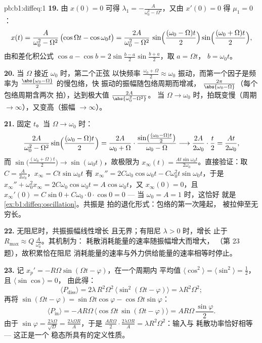 \begin{solution}{pb:b1:diffeq:1}
\textbf{19.} 由 $x(0) = 0$ 可得 $\lambda_1 = -\frac A{\omega_0^2 -
\Omega^2}$，又由 $x'(0) = 0$ 得 $\mu_1 = 0$：
\[
x(t) = \frac{A}{\omega_0^2 - \Omega^2}\,
\bigl(\cos\Omega t - \cos\omega_0 t\bigr)
= \frac{2A}{\omega_0^2 - \Omega^2}\,
\sin\Bigl(\frac{(\omega_0 - \Omega)t}2\Bigr)
\sin\Bigl(\frac{(\omega_0 + \Omega)t}2\Bigr) ,
\]
由和差化积公式 $\cos a - \cos b =
2\sin\frac{b - a}2\sin\frac{b + a}2$，取 $a = \Omega t$，
$b = \omega_0 t$。

\textbf{20.} 当 $\Omega$ 接近 $\omega_0$ 时，第二个正弦
以快频率 $\frac{\omega_0 + \Omega}2
\approx \omega_0$ 振动，而第一个因子是频率为
$\frac{\abs{\omega_0 - \Omega}}2$ 的慢包络，快
振动的振幅随包络周期而增减，
$\frac{2\pi}{\abs{\omega_0 - \Omega}}$（每个包络周期含两次
拍），达到极大值 $\frac{2A}{\abs{\omega_0^2 - \Omega^2}}$。
当 $\Omega \to \omega_0$ 时，拍既变慢（周期
$\to \infty$），又变高（振幅 $\to \infty$）。

\textbf{21.} 固定 $t$。当 $\Omega \to \omega_0$ 时：
\[
\frac{2A}{\omega_0^2 - \Omega^2}\sin\Bigl(\frac{(\omega_0 -
\Omega)t}2\Bigr)
= \frac{2A}{\omega_0 + \Omega}\cdot
\frac{\sin\bigl(\frac{(\omega_0 - \Omega)t}2\bigr)}
{\omega_0 - \Omega}
\longrightarrow \frac{2A}{2\omega_0}\cdot\frac t2
= \frac{At}{2\omega_0} ,
\]
而 $\sin\bigl(\frac{(\omega_0 + \Omega)t}2\bigr) \to
\sin(\omega_0 t)$，故极限为 $x_\infty(t) =
\frac{At\sin\omega_0 t}{2\omega_0}$。直接验证：取 $C =
\frac A{2\omega_0}$，$x_\infty = Ct\sin\omega_0 t$ 有
$x_\infty'' = 2C\omega_0\cos\omega_0 t - C\omega_0^2 t
\sin\omega_0 t$，于是 $x_\infty'' + \omega_0^2 x_\infty =
2C\omega_0\cos\omega_0 t = A\cos\omega_0 t$，又 $x_\infty(0) =
0$，且 $x_\infty'(0) = C\sin 0 + C\omega_0 \cdot 0 \cdot \cos 0 =
0$ --- 当 $\omega_0 = A = 1$ 时，这恰好
就是\cref{ex:b1:diffeq:oscillation}。共振是
拍的退化形式：包络的第一次隆起，
被拉伸至无穷长。

\textbf{22.} 无阻尼时，共振振幅线性增长
且无界；有阻尼 $\lambda > 0$ 时，增长
止于 $R_{\max} \approx Q\,\frac A{\omega_0^2}$。其机制为：
耗散消耗能量的速率随振幅增大而增大，
（第 23 题），故积累恰在阻尼
消耗能量的速率与外力供给能量的速率相等时停止。

\textbf{23.} 记 $x_p' = -R\Omega\sin(\Omega t - \varphi)$，在一个周期内
平均值 $\langle\cos^2\rangle =
\langle\sin^2\rangle = \frac12$，且 $\langle\sin\cos\rangle = 0$，
由此得：
\[
\langle P_{\mathrm{diss}}\rangle
= 2\lambda\,R^2\Omega^2\,\langle\sin^2(\Omega t -
\varphi)\rangle = \lambda R^2\Omega^2 ;
\]
再将 $\sin(\Omega t - \varphi) = \sin\Omega t\cos\varphi
- \cos\Omega t\sin\varphi$：
\[
\langle P_{\mathrm{in}}\rangle
= -AR\Omega\,\bigl\langle\cos\Omega t\,\sin(\Omega t -
\varphi)\bigr\rangle
= AR\Omega\,\frac{\sin\varphi}2 .
\]
由于 $\sin\varphi = \frac{2\lambda\Omega}{\sqrt D} =
\frac{2\lambda\Omega R}A$，于是 $\frac{AR\Omega}2 \cdot
\frac{2\lambda\Omega R}A = \lambda R^2\Omega^2$：输入与
耗散功率恰好相等 --- 这正是一个
稳态所具有的定义性质。


\end{solution}
